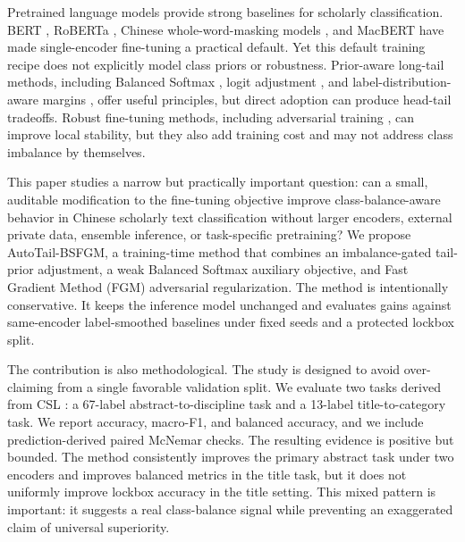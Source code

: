 \documentclass[10pt]{article}
\begin{document}
Pretrained language models provide strong baselines for scholarly classification. BERT \citep{devlin2019bert}, RoBERTa \citep{liu2019roberta}, Chinese whole-word-masking models \citep{cui2019wwm}, and MacBERT \citep{cui2020revisiting} have made single-encoder fine-tuning a practical default. Yet this default training recipe does not explicitly model class priors or robustness. Prior-aware long-tail methods, including Balanced Softmax \citep{ren2020balanced}, logit adjustment \citep{menon2021logit}, and label-distribution-aware margins \citep{cao2019ldam}, offer useful principles, but direct adoption can produce head-tail tradeoffs. Robust fine-tuning methods, including adversarial training \citep{goodfellow2015explaining,miyato2016adversarial,zhu2020freelb,jiang2020smart}, can improve local stability, but they also add training cost and may not address class imbalance by themselves.

This paper studies a narrow but practically important question: can a small, auditable modification to the fine-tuning objective improve class-balance-aware behavior in Chinese scholarly text classification without larger encoders, external private data, ensemble inference, or task-specific pretraining? We propose AutoTail-BSFGM, a training-time method that combines an imbalance-gated tail-prior adjustment, a weak Balanced Softmax auxiliary objective, and Fast Gradient Method (FGM) adversarial regularization. The method is intentionally conservative. It keeps the inference model unchanged and evaluates gains against same-encoder label-smoothed baselines under fixed seeds and a protected lockbox split.

The contribution is also methodological. The study is designed to avoid over-claiming from a single favorable validation split. We evaluate two tasks derived from CSL \citep{li-etal-2022-csl}: a 67-label abstract-to-discipline task and a 13-label title-to-category task. We report accuracy, macro-F1, and balanced accuracy, and we include prediction-derived paired McNemar checks. The resulting evidence is positive but bounded. The method consistently improves the primary abstract task under two encoders and improves balanced metrics in the title task, but it does not uniformly improve lockbox accuracy in the title setting. This mixed pattern is important: it suggests a real class-balance signal while preventing an exaggerated claim of universal superiority.
\end{document}
